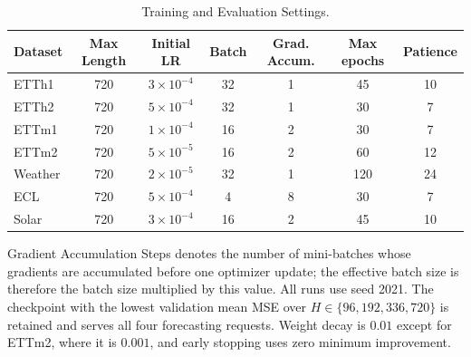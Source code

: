 \begin{table}[t]
\centering
\scriptsize
\setlength{\tabcolsep}{4pt}
\caption{Training and Evaluation Settings.}
\label{tab:training-settings}
\begin{tabular}{lcccccc}
\toprule
Dataset & Max Length & Initial LR & Batch & Grad. Accum. & Max epochs & Patience \\
\midrule
ETTh1 & 720 & $3\times10^{-4}$ & 32 & 1 & 45 & 10 \\
ETTh2 & 720 & $5\times10^{-4}$ & 32 & 1 & 30 & 7 \\
ETTm1 & 720 & $1\times10^{-4}$ & 16 & 2 & 30 & 7 \\
ETTm2 & 720 & $5\times10^{-5}$ & 16 & 2 & 60 & 12 \\
Weather & 720 & $2\times10^{-5}$ & 32 & 1 & 120 & 24 \\
ECL & 720 & $5\times10^{-4}$ & 4 & 8 & 30 & 7 \\
Solar & 720 & $3\times10^{-4}$ & 16 & 2 & 45 & 10 \\
\bottomrule
\end{tabular}
\end{table}


Gradient Accumulation Steps denotes the number of mini-batches whose gradients are accumulated before one optimizer update; the effective batch size is therefore the batch size multiplied by this value. All runs use seed 2021. The checkpoint with the lowest validation mean MSE over $H\in\{96,192,336,720\}$ is retained and serves all four forecasting requests. Weight decay is $0.01$ except for ETTm2, where it is $0.001$, and early stopping uses zero minimum improvement.

\begin{table}[t]
\centering
\scriptsize
\setlength{\tabcolsep}{4pt}
\caption{HoriScope Configuration.}
\label{tab:model-settings}
\end{table}


